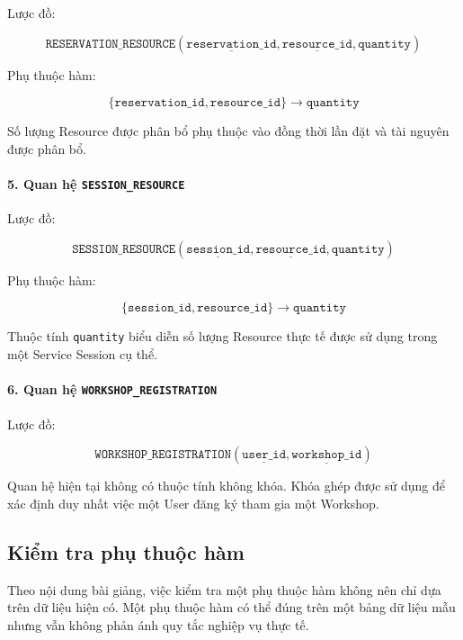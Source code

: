 Lược đồ:

$$
\texttt{RESERVATION\_RESOURCE}(
\underline{\texttt{reservation\_id}},
\underline{\texttt{resource\_id}},
\texttt{quantity})
$$

Phụ thuộc hàm:

$$
\{
\texttt{reservation\_id},
\texttt{resource\_id}
\}
\rightarrow
\texttt{quantity}
$$

Số lượng Resource được phân bổ phụ thuộc vào đồng thời lần đặt và tài nguyên được phân bổ.

\paragraph{5. Quan hệ \texttt{SESSION\_RESOURCE}}\mbox{}\par

Lược đồ:

$$
\texttt{SESSION\_RESOURCE}(
\underline{\texttt{session\_id}},
\underline{\texttt{resource\_id}},
\texttt{quantity})
$$

Phụ thuộc hàm:

$$
\{
\texttt{session\_id},
\texttt{resource\_id}
\}
\rightarrow
\texttt{quantity}
$$

Thuộc tính \texttt{quantity} biểu diễn số lượng Resource thực tế được sử dụng trong một Service Session cụ thể.

\paragraph{6. Quan hệ \texttt{WORKSHOP\_REGISTRATION}}\mbox{}\par

Lược đồ:

$$
\texttt{WORKSHOP\_REGISTRATION}(
\underline{\texttt{user\_id}},
\underline{\texttt{workshop\_id}})
$$

Quan hệ hiện tại không có thuộc tính không khóa. Khóa ghép được sử dụng để xác định duy nhất việc một User đăng ký tham gia một Workshop.

\subsection{Kiểm tra phụ thuộc hàm}\mbox{}\par

Theo nội dung bài giảng, việc kiểm tra một phụ thuộc hàm không nên chỉ dựa trên dữ liệu hiện có. Một phụ thuộc hàm có thể đúng trên một bảng dữ liệu mẫu nhưng vẫn không phản ánh quy tắc nghiệp vụ thực tế.

